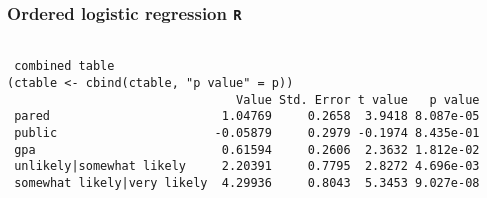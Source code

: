 \documentclass[00-GLMregslides.tex]{subfiles}
\begin{document}
\begin{frame}[fragile]
	\frametitle{Ordered logistic regression \texttt{R} }
	\large
\begin{framed}		
	\begin{verbatim}
		
 combined table
(ctable <- cbind(ctable, "p value" = p))
                                Value Std. Error t value   p value
 pared                        1.04769     0.2658  3.9418 8.087e-05
 public                      -0.05879     0.2979 -0.1974 8.435e-01
 gpa                          0.61594     0.2606  2.3632 1.812e-02
 unlikely|somewhat likely     2.20391     0.7795  2.8272 4.696e-03
 somewhat likely|very likely  4.29936     0.8043  5.3453 9.027e-08
\end{verbatim}
\end{framed}
\end{frame} 

\end{document}
